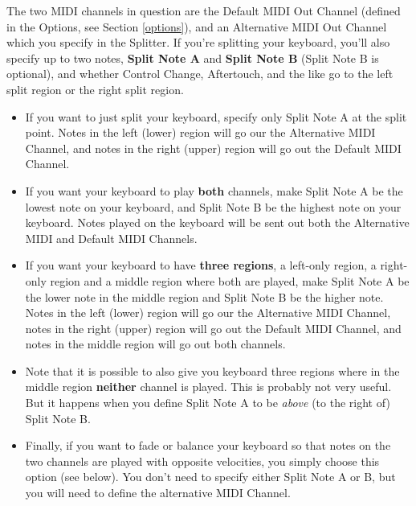 \documentclass{article}
\begin{document}
The two MIDI channels in question are the Default MIDI Out Channel (defined in the Options, see Section \ref{options}), and an Alternative MIDI Out Channel which you specify in the Splitter.  If you're splitting your keyboard, you'll also specify up to two notes, {\bf Split Note A} and {\bf Split Note B}  (Split Note B is optional), and whether Control Change, Aftertouch, and the like go to the left split region or the right split region.

\begin{itemize}
\item  If you want to just split your keyboard, specify only Split Note A at the split point.  Notes in the left (lower) region will go our the Alternative MIDI Channel, and notes in the right (upper) region will go out the Default MIDI Channel.

\item If you want your keyboard to play {\bf both} channels, make Split Note A be the lowest note on your keyboard, and Split Note B be the highest note on your keyboard.    Notes played on the keyboard will be sent out both the Alternative MIDI and Default MIDI Channels. 

\item If you want your keyboard to have {\bf three regions}, a left-only region, a right-only region and a middle region where both are played, make Split Note A be the lower note in the middle region and Split Note B be the higher note.   Notes in the left (lower) region will go our the Alternative MIDI Channel, notes in the right (upper) region will go out the Default MIDI Channel, and notes in the middle region will go out both channels.

\item Note that it is possible to also give you keyboard three regions where in the middle region {\bf neither} channel is played.  This is probably not very useful.  But it happens when you define Split Note A to be {\it above} (to the right of) Split Note B.

\item Finally, if you want to fade or balance your keyboard so that notes on the two channels are played with opposite velocities, you simply choose this option (see below).  You don't need to specify either Split Note A or B, but you will need to define the alternative MIDI Channel.
\end{itemize}
\end{document}
